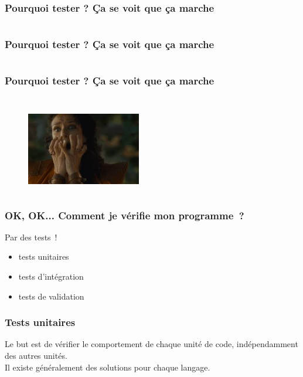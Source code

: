 \documentclass{beamer}
\begin{document}
\begin{frame}
    \frametitle{Pourquoi tester ? Ça se voit que ça marche}
    \inputminted{python}{../code/python/intro/def_arg_0.py}
\end{frame}

\begin{frame}
    \frametitle{Pourquoi tester ? Ça se voit que ça marche}
    \inputminted{python}{../code/python/intro/def_arg_1.py}
\end{frame}

\begin{frame}
    \frametitle{Pourquoi tester ? Ça se voit que ça marche}
    \inputminted{python}{../code/python/intro/def_arg_2.py}
    \begin{columns}
        \begin{figure}
            \includegraphics[width=5cm]{img/horror.jpg}
        \end{figure}
    \end{columns}
\end{frame}


\begin{frame}
    \frametitle{OK, OK... Comment je vérifie mon programme ?}
    Par des tests !

    \begin{itemize}
        \item tests unitaires
        \item tests d'intégration
        \item tests de validation
    \end{itemize}
\end{frame}


\begin{frame}
    \frametitle{Tests unitaires}
    Le but est de vérifier le comportement de chaque unité de code, indépendamment des autres unités.\\
    Il existe généralement des solutions pour chaque langage.\\
\end{frame}
\end{document}
